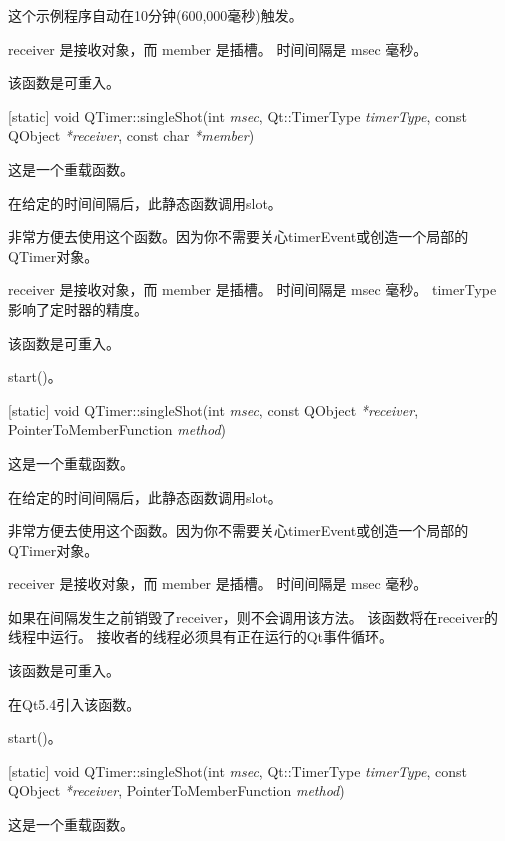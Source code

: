 这个示例程序自动在10分钟(600,000毫秒)触发。

receiver 是接收对象，而 member 是插槽。 时间间隔是 msec 毫秒。

\begin{notice}
该函数是可重入。
\end{notice}

[static] void QTimer::singleShot(int \emph{msec}, Qt::TimerType \emph{timerType}, const QObject \emph{*receiver}, const char \emph{*member})

这是一个重载函数。

在给定的时间间隔后，此静态函数调用slot。

非常方便去使用这个函数。因为你不需要关心timerEvent或创造一个局部的QTimer对象。

receiver 是接收对象，而 member 是插槽。 时间间隔是 msec 毫秒。 timerType 影响了定时器的精度。

\begin{notice}
该函数是可重入。
\end{notice}

\begin{seeAlso}
start()。
\end{seeAlso}


[static] void QTimer::singleShot(int \emph{msec}, const QObject \emph{*receiver}, PointerToMemberFunction \emph{method})

这是一个重载函数。

在给定的时间间隔后，此静态函数调用slot。

非常方便去使用这个函数。因为你不需要关心timerEvent或创造一个局部的QTimer对象。

receiver 是接收对象，而 member 是插槽。 时间间隔是 msec 毫秒。

如果在间隔发生之前销毁了receiver，则不会调用该方法。 该函数将在receiver的线程中运行。 接收者的线程必须具有正在运行的Qt事件循环。


\begin{notice}
该函数是可重入。
\end{notice}

在Qt5.4引入该函数。

\begin{seeAlso}
start()。
\end{seeAlso}

[static] void QTimer::singleShot(int \emph{msec}, Qt::TimerType \emph{timerType}, const QObject \emph{*receiver}, PointerToMemberFunction \emph{method})

这是一个重载函数。

